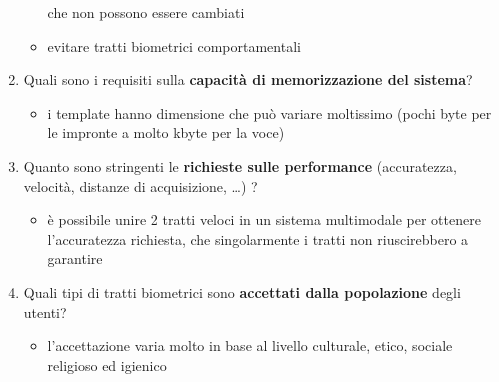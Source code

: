 \documentclass{report}
\begin{document}
\begin{enumerate}
\begin{itemize}
        che non possono essere cambiati
        \item evitare tratti biometrici comportamentali
    \end{itemize}
    \item Quali sono i requisiti sulla \textbf{capacità di memorizzazione del sistema}?
    \begin{itemize}
        \item i template hanno dimensione che può variare moltissimo (pochi byte per le impronte 
        a molto kbyte per la voce)
    \end{itemize}
    \item Quanto sono stringenti le \textbf{richieste sulle performance} (accuratezza, velocità, 
    distanze di acquisizione, \dots) ?
    \begin{itemize}
        \item è possibile unire 2 tratti veloci in un sistema multimodale per ottenere l'accuratezza
        richiesta, che singolarmente i tratti non riuscirebbero a garantire
    \end{itemize}
    \item Quali tipi di tratti biometrici sono \textbf{accettati dalla popolazione}
    degli utenti?
    \begin{itemize}
        \item l'accettazione varia molto in base al livello culturale, etico, sociale religioso 
        ed igienico
    \end{itemize}
\end{enumerate}
\end{document}
